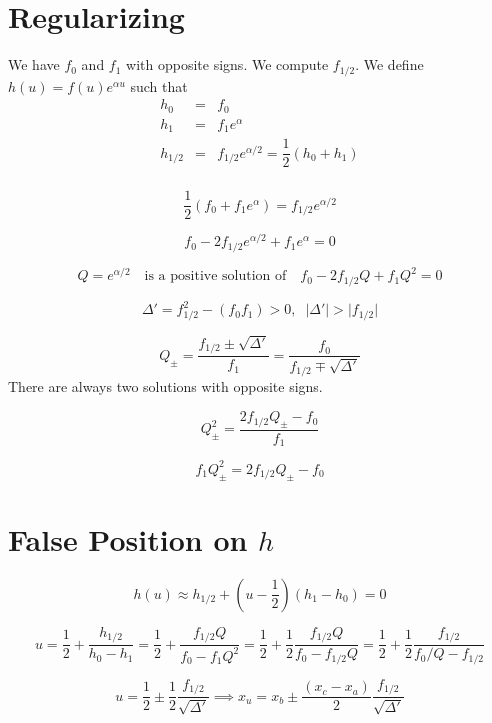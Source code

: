 \documentclass[aps,11pt]{revtex4}
\begin{document}
\section{Regularizing}
We have $f_0$ and $f_1$ with opposite signs.
We compute $f_{1/2}$.
We define $h(u) = f(u) e^{\alpha u}$ such that
\begin{equation}
\begin{array}{lcl}
h_0  & = & f_0  \\
h_1  & = & f_1 e^{\alpha} \\
h_{1/2} & = & f_{1/2} e^{\alpha/2} = \dfrac{1}{2}( h_0+h_1 )\\
\end{array}
\end{equation}
 
\begin{equation}
	\dfrac{1}{2}( f_0+f_1 e^\alpha ) = f_{1/2} e^{\alpha/2} 
\end{equation} 

\begin{equation}
	f_0 - 2 f_{1/2} e^{\alpha/2}  + f_1 e^\alpha = 0
\end{equation} 

$$
	 Q = e^{\alpha/2} \text{~~~is a positive solution of~~~} f_0 - 2 f_{1/2} Q  + f_1 Q^2 = 0
$$

\begin{equation}
	\Delta' = f_{1/2}^2 - (f_0f_1) > 0, \;\; \vert \Delta' \vert > \vert f_{1/2} \vert
\end{equation}

\begin{equation}
	Q_\pm = \dfrac{ f_{1/2} \pm \sqrt{\Delta'} }{f_1} = \dfrac{f_0}{f_{1/2} \mp \sqrt{\Delta'}}
\end{equation}
There are always two solutions with opposite signs.
 
\begin{equation}
	Q_\pm^2 = \dfrac{2f_{1/2}Q_\pm - f_0}{f_1}
\end{equation}
 
\begin{equation}
	f_1 Q_\pm^2 =  2f_{1/2}Q_\pm - f_0
\end{equation}

\section{False Position on $h$}

$$
	h(u) \approx h_{1/2} + (u-\frac{1}{2}) (h_1-h_0) = 0 
	 $$

$$
	u = \dfrac{1}{2} + \dfrac{h_{1/2}}{h_0 - h_1} = \dfrac{1}{2} + \dfrac{f_{1/2}Q}{f_0 - f_1 Q^2}
	= \dfrac{1}{2} + \dfrac{1}{2} \dfrac{f_{1/2}Q}{f_0-f_{1/2}Q}
	= \dfrac{1}{2} + \dfrac{1}{2}\dfrac{f_{1/2}}{f_0/Q - f_{1/2}}
$$
 
$$
	u = \dfrac{1}{2} \pm \dfrac{1}{2} \dfrac{f_{1/2}}{\sqrt{\Delta'}} \implies x_u = x_b \pm \dfrac{(x_c-x_a)}{2}   \dfrac{f_{1/2}}{\sqrt{\Delta'}}
$$ 
 
\end{document}

